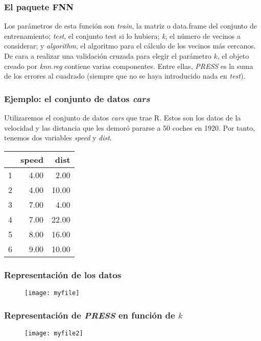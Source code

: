 \documentclass{beamer}
\theoremstyle{definition}
\begin{document}
\begin{frame}
\frametitle{El paquete FNN}

Los parámetros de esta función son \textit{train}, la matriz o data.frame del conjunto de entrenamiento; \textit{test}, el conjunto test si lo hubiera; \textit{k}, el número de vecinos a considerar; y \textit{algorithm}, el algoritmo para el cálculo de los vecinos más cercanos.
\newline
\\
De cara a realizar una validación cruzada para elegir el parámetro $k$, el objeto creado por \textit{knn.reg} contiene varias componentes.  Entre ellas, \textit{PRESS} es la suma de los errores al cuadrado (siempre que no se haya introducido nada en \textit{test}).

\end{frame}
\begin{frame}
\frametitle{Ejemplo: el conjunto de datos \textit{cars}}
Utilizaremos el conjunto de datos \textit{cars} que trae R. Estos son los datos de la velocidad y las distancia que les demoró pararse a 50 coches en 1920. Por tanto, tenemos dos variables \textit{speed} y \textit{dist}.
\begin{table}[ht]
\centering
\begin{tabular}{rrr}
  \hline
 & speed & dist \\ 
  \hline
1 & 4.00 & 2.00 \\ 
  2 & 4.00 & 10.00 \\ 
  3 & 7.00 & 4.00 \\ 
  4 & 7.00 & 22.00 \\ 
  5 & 8.00 & 16.00 \\ 
  6 & 9.00 & 10.00 \\ 
   \hline
\end{tabular}
\end{table}

\end{frame}


\begin{frame}
\frametitle{Representación de los datos}
\begin{figure}[h!]
\texttt{[image: myfile]}
\end{figure}
\end{frame}


\begin{frame}
\frametitle{Representación de \textit{PRESS} en función de $k$}
\begin{figure}[h!]
\texttt{[image: myfile2]}
\end{figure}
\end{frame}
\end{document}
